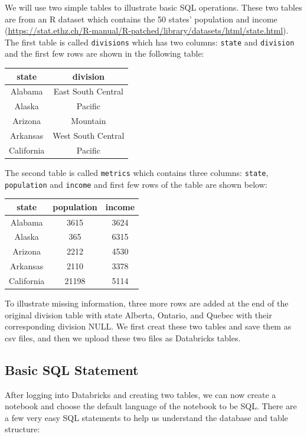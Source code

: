 \documentclass[
  12pt,
]{krantz}
\begin{document}
We will use two simple tables to illustrate basic SQL operations. These two tables are from an R dataset which contains the 50 states' population and income (\url{https://stat.ethz.ch/R-manual/R-patched/library/datasets/html/state.html}). The first table is called \texttt{divisions} which has two columns: \texttt{state} and \texttt{division} and the first few rows are shown in the following table:

\begin{longtable}[]{@{}cc@{}}
\toprule
state & division \\
\midrule
\endhead
Alabama & East South Central \\
Alaska & Pacific \\
Arizona & Mountain \\
Arkansas & West South Central \\
California & Pacific \\
\bottomrule
\end{longtable}

The second table is called \texttt{metrics} which contains three columns: \texttt{state}, \texttt{population} and \texttt{income} and first few rows of the table are shown below:

\begin{longtable}[]{@{}ccc@{}}
\toprule
state & population & income \\
\midrule
\endhead
Alabama & 3615 & 3624 \\
Alaska & 365 & 6315 \\
Arizona & 2212 & 4530 \\
Arkansas & 2110 & 3378 \\
California & 21198 & 5114 \\
\bottomrule
\end{longtable}

To illustrate missing information, three more rows are added at the end of the original division table with state Alberta, Ontario, and Quebec with their corresponding division NULL. We first creat these two tables and save them as csv files, and then we upload these two files as Databricks tables.

\hypertarget{basic-sql-statement}{%
\subsection{Basic SQL Statement}\label{basic-sql-statement}}

After logging into Databricks and creating two tables, we can now create a notebook and choose the default language of the notebook to be SQL. There are a few very easy SQL statements to help us understand the database and table structure:
\end{document}
